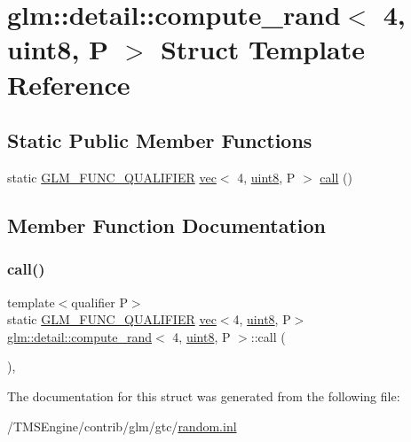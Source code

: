 \hypertarget{structglm_1_1detail_1_1compute__rand_3_014_00_01uint8_00_01_p_01_4}{}\section{glm\+:\+:detail\+:\+:compute\+\_\+rand$<$ 4, uint8, P $>$ Struct Template Reference}
\label{structglm_1_1detail_1_1compute__rand_3_014_00_01uint8_00_01_p_01_4}
\subsection*{Static Public Member Functions}
\begin{DoxyCompactItemize}
\item 
static \hyperlink{setup_8hpp_a33fdea6f91c5f834105f7415e2a64407}{G\+L\+M\+\_\+\+F\+U\+N\+C\+\_\+\+Q\+U\+A\+L\+I\+F\+I\+ER} \hyperlink{structglm_1_1vec}{vec}$<$ 4, \hyperlink{namespaceglm_1_1detail_aef2588f97d090cc19fbbe0c74fe17c8f}{uint8}, P $>$ \hyperlink{structglm_1_1detail_1_1compute__rand_3_014_00_01uint8_00_01_p_01_4_ad77b64fbdc24b387174b436980e33a8c}{call} ()
\end{DoxyCompactItemize}


\subsection{Member Function Documentation}
\mbox{\label{structglm_1_1detail_1_1compute__rand_3_014_00_01uint8_00_01_p_01_4_ad77b64fbdc24b387174b436980e33a8c}} 
\subsubsection{\texorpdfstring{call()}{call()}}
{\footnotesize\ttfamily template$<$qualifier P$>$ \\
static \hyperlink{setup_8hpp_a33fdea6f91c5f834105f7415e2a64407}{G\+L\+M\+\_\+\+F\+U\+N\+C\+\_\+\+Q\+U\+A\+L\+I\+F\+I\+ER} \hyperlink{structglm_1_1vec}{vec}$<$4, \hyperlink{namespaceglm_1_1detail_aef2588f97d090cc19fbbe0c74fe17c8f}{uint8}, P$>$ \hyperlink{structglm_1_1detail_1_1compute__rand}{glm\+::detail\+::compute\+\_\+rand}$<$ 4, \hyperlink{namespaceglm_1_1detail_aef2588f97d090cc19fbbe0c74fe17c8f}{uint8}, P $>$\+::call (\begin{DoxyParamCaption}{ }\end{DoxyParamCaption})\hspace{0.3cm}{\ttfamily [inline]}, {\ttfamily [static]}}



The documentation for this struct was generated from the following file\+:\begin{DoxyCompactItemize}
\item 
/\+T\+M\+S\+Engine/contrib/glm/gtc/\hyperlink{random_8inl}{random.\+inl}\end{DoxyCompactItemize}

